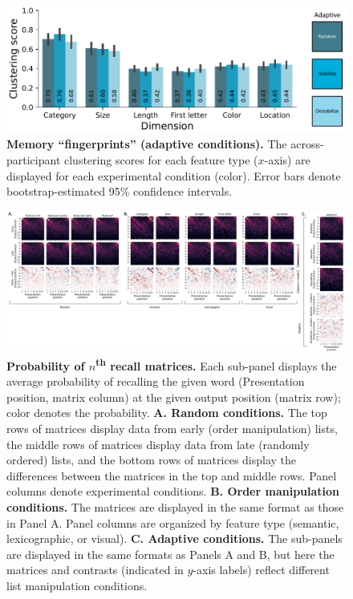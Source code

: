\documentclass{article}
\begin{document}
\begin{figure}[tp] \centering
    \includegraphics[width=\textwidth]{figures/fingerprints_adaptive}
    
\caption{\textbf{Memory ``fingerprints'' (adaptive conditions).} The
across-participant clustering scores for each feature type ($x$-axis) are
displayed for each experimental condition (color). Error bars denote
bootstrap-estimated 95\% confidence intervals.}

\label{fig:fingerprints-adaptive} \end{figure}


\begin{figure}
    \includegraphics[width=\textwidth]{figures/pnr_matrices}

    \caption{\textbf{Probability of $n$\textsuperscript{th} recall matrices.}
    Each sub-panel displays the average probability of recalling the given word
    (Presentation position, matrix column) at the given output position (matrix
    row); color denotes the probability. \textbf{A. Random conditions.} The top
    rows of matrices display data from early (order manipulation) lists, the
    middle rows of matrices display data from late (randomly ordered) lists,
    and the bottom rows of matrices display the differences between the
    matrices in the top and middle rows. Panel columns denote experimental
    conditions. \textbf{B. Order manipulation conditions.} The matrices are
    displayed in the same format as those in Panel A. Panel columns are
    organized by feature type (semantic, lexicographic, or visual). \textbf{C.
    Adaptive conditions.} The sub-panels are displayed in the same formats as
    Panels A and B, but here the matrices and contrasts (indicated in $y$-axis
    labels) reflect different list manipulation conditions.}

    \label{fig:pnr}
\end{figure}
\end{document}
